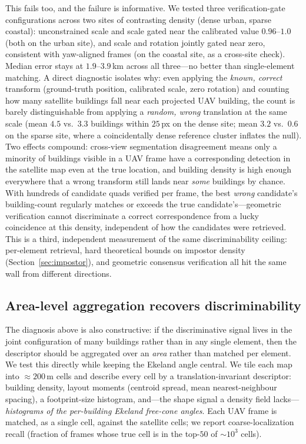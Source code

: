 \documentclass[10pt]{article}
\theoremstyle{plain}
\theoremstyle{definition}
\begin{document}
This fails too, and the failure is informative. We tested three
verification-gate configurations across two sites of contrasting density
(dense urban, sparse coastal): unconstrained scale and scale gated near the
calibrated value $0.96$--$1.0$ (both on the urban site), and scale and
rotation jointly gated near zero, consistent with yaw-aligned frames (on the
coastal site, as a cross-site check). Median error stays at
$1.9$--$3.9$\,km across all three---no better than single-element matching.
A direct diagnostic isolates why: even applying the
\emph{known, correct} transform (ground-truth position, calibrated scale,
zero rotation) and counting how many satellite buildings fall near each
projected UAV building, the count is barely distinguishable from applying a
\emph{random, wrong} translation at the same scale (mean $4.5$ vs.\ $3.3$
buildings within $25$\,px on the dense site; mean $3.2$ vs.\ $0.6$ on the
sparse site, where a coincidentally dense reference cluster inflates the null).
Two effects compound: cross-view segmentation disagreement means only a
minority of buildings visible in a UAV frame have a corresponding detection
in the satellite map even at the true location, and building density is high
enough everywhere that a wrong transform still lands near \emph{some}
buildings by chance. With hundreds of candidate quads verified per frame, the
best \emph{wrong} candidate's building-count regularly matches or exceeds the
true candidate's---geometric verification cannot discriminate a correct
correspondence from a lucky coincidence at this density, independent of how
the candidates were retrieved. This is a third, independent measurement of
the same discriminability ceiling: per-element retrieval, hard theoretical
bounds on impostor density (Section~\ref{sec:impostor}), and geometric
consensus verification all hit the same wall from different directions.

\subsection{Area-level aggregation recovers discriminability}
\label{sec:area}

The diagnosis above is also constructive: if the discriminative signal lives in
the joint configuration of many buildings rather than in any single element,
then the descriptor should be aggregated over an \emph{area} rather than matched
per element. We test this directly while keeping the Ekeland angle central.
We tile each map into $\approx200$\,m cells and describe every cell by a
translation-invariant descriptor: building density, layout moments
(centroid spread, mean nearest-neighbour spacing), a footprint-size histogram,
and---the shape signal a density field lacks---\emph{histograms of the
per-building Ekeland free-cone angles}. Each UAV frame is matched, as a single
cell, against the satellite cells; we report coarse-localization recall
(fraction of frames whose true cell is in the top-$50$ of ${\sim}10^{3}$
cells).
\end{document}
